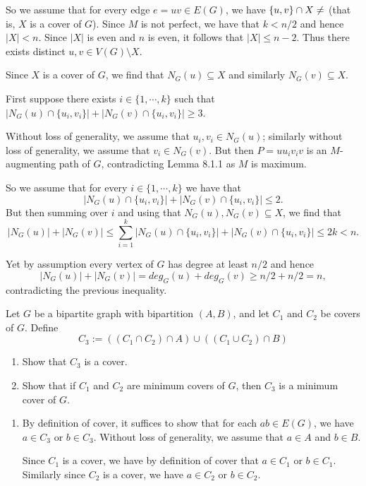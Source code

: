 \begin{enumerate}
    So we assume that for every edge $e = uv \in E(G)$, we have $\{u,v\} \cap X \neq \empty$ (that is, $X$ is a cover of $G$). Since $M$ is not perfect, we have that $k < n/2$ and hence $|X| < n$. Since $|X|$ is even and $n$ is even, it follows that $|X| \leq n-2$. Thus there exists distinct $u,v\in V(G) \setminus X$.

    Since $X$ is a cover of $G$, we find that $N_G(u) \subseteq X$ and similarly $N_G(v) \subseteq X$.

    First suppose there exists $i \in \{1, \cdots, k\}$ such that $|N_G(u) \cap \{u_i, v_i\}| + |N_G(v) \cap \{u_i, v_i\}| \geq 3$.

    Without loss of generality, we assume that $u_i, v_i \in N_G(u)$; similarly without loss of generality, we assume that $v_i \in N_G(v)$. But then $P = uu_iv_iv$ is an $M$-augmenting path of $G$, contradicting Lemma 8.1.1 as $M$ is maximum.

    So we assume that for every $i \in \{1, \cdots, k\}$ we have that
    \[|N_G(u) \cap \{u_i, v_i\}| + |N_G(v) \cap \{u_i, v_i\}| \leq 2.\]
    But then summing over $i$ and using that $N_G(u), N_G(v) \subseteq X$, we find that 
    \[|N_G(u)| + |N_G(v)| \leq \sum_{i=1}^k |N_G(u) \cap \{u_i, v_i\}| + |N_G(v) \cap \{u_i, v_i\}| \leq 2k < n.\]
    
    Yet by assumption every vertex of $G$ has degree at least $n/2$ and hence 
    \[|N_G(u)| + |N_G(v)| = deg_G(u) + deg_G(v) \geq n/2 + n/2 = n,\]
    contradicting the previous inequality.

     Let $G$ be a bipartite graph with bipartition $(A,B)$, and let $C_1$ and $C_2$ be covers of $G$. Define 
    \[C_3 := \left( (C_1 \cap C_2) \cap A \right) \cup ((C_1 \cup  C_2) \cap B)\]
    \begin{enumerate}
        \item Show that $C_3$ is a cover.
        \item Show that if $C_1$ and $C_2$ are minimum covers of $G$, then $C_3$ is a minimum cover of $G$.
    \end{enumerate}
    \answer 
    \begin{enumerate}
        \item By definition of cover, it suffices to show that for each $ab \in E(G)$, we have $a \in C_3$ or $b \in C_3$. Without loss of generality, we assume that $a \in A$ and $b \in B$.

        Since $C_1$ is a cover, we have by definition of cover that $a \in C_1$ or $b\in C_1$. Similarly since $C_2$ is a cover, we have $a\in C_2$ or $b\in C_2$.


\end{enumerate}
\end{enumerate}
